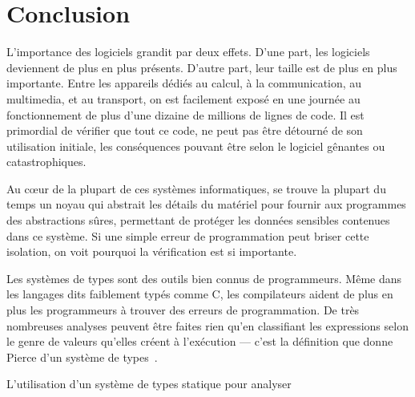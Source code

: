 
\section{Conclusion}


L'importance des logiciels grandit par deux effets.
D'une part, les logiciels deviennent de plus en plus présents.
D'autre part, leur taille est de plus en plus importante.
Entre les appareils dédiés au calcul, à la communication, au multimedia, et au
transport, on est facilement exposé en une journée au fonctionnement de plus
d'une dizaine de millions de lignes de code.
Il est primordial de vérifier que tout ce code, ne peut pas être détourné de son
utilisation initiale, les conséquences pouvant être selon le logiciel gênantes
ou catastrophiques.

Au cœur de la plupart de ces systèmes informatiques, se trouve la plupart du
temps un noyau qui abstrait les détails du matériel pour fournir aux programmes
des abstractions sûres, permettant de protéger les données sensibles contenues
dans ce système. Si une simple erreur de programmation peut briser cette
isolation, on voit pourquoi la vérification est si importante.

\jolibreak

Les systèmes de types sont des outils bien connus de programmeurs. Même dans les
langages dits faiblement typés comme C, les compilateurs aident de plus en plus
les programmeurs à trouver des erreurs de programmation. De très nombreuses
analyses peuvent être faites rien qu'en classifiant les expressions selon le
genre de valeurs qu'elles créent à l'exécution --- c'est la définition que donne
Pierce d'un système de types~\cite[p.~1]{TAPL}.

L'utilisation d'un système de types statique pour analyser



